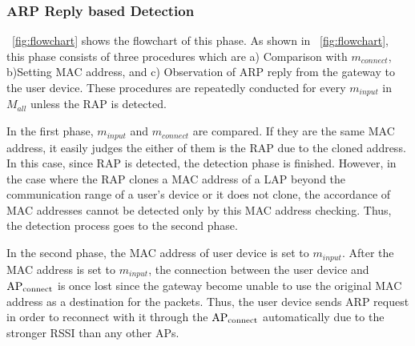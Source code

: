 \documentclass[conference]{IEEEtran}
\newcommand{\tarAP}{\rm AP_{connect}}
\newcommand{\tarMAC}{m_{connect}}
\newcommand{\inputMAC}{m_{input}}
\begin{document}
\subsubsection{ARP Reply based Detection}
\figurename~\ref{fig:flowchart} shows the flowchart of this phase.
As shown in \figurename~\ref{fig:flowchart}, this phase consists of three procedures which are a) Comparison with $\tarMAC$, b)Setting MAC address, and c) Observation of ARP reply from the gateway to the user device.
These procedures are repeatedly conducted for every $m_{input}$ in $M_{all}$ unless the RAP is detected.

In the first phase, $\inputMAC$ and $\tarMAC$ are compared.
If they are the same MAC address, it easily judges the either of them is the RAP due to the cloned address.
In this case, since RAP is detected, the detection phase is finished.
However, in the case where the RAP clones a MAC address of a LAP beyond the communication range of a user's device or it does not clone, the accordance of MAC addresses cannot be detected only by this MAC address checking.
Thus, the detection process goes to the second phase.

In the second phase, the MAC address of user device is set to $\inputMAC$.
After the MAC address is set to $\inputMAC$, the connection between the user device and $\tarAP$ is once lost since the gateway become unable to use the original MAC address as a destination for the packets.
Thus, the user device sends ARP request in order to reconnect with it through the $\tarAP$ automatically due to the stronger RSSI than any other APs.
\end{document}

